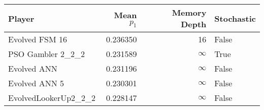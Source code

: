 \begin{tabular}{lrrl}
\toprule
               Player &  Mean $p_1$ &  Memory Depth & Stochastic \\
\midrule
       Evolved FSM 16 &    0.236350 &            16 &      False \\
    PSO Gambler 2\_2\_2 &    0.231589 &            \(\infty\) &       True \\
          Evolved ANN &    0.231196 &            \(\infty\) &      False \\
        Evolved ANN 5 &    0.230301 &            \(\infty\) &      False \\
 EvolvedLookerUp2\_2\_2 &    0.228147 &            \(\infty\) &      False \\
\bottomrule
\end{tabular}
